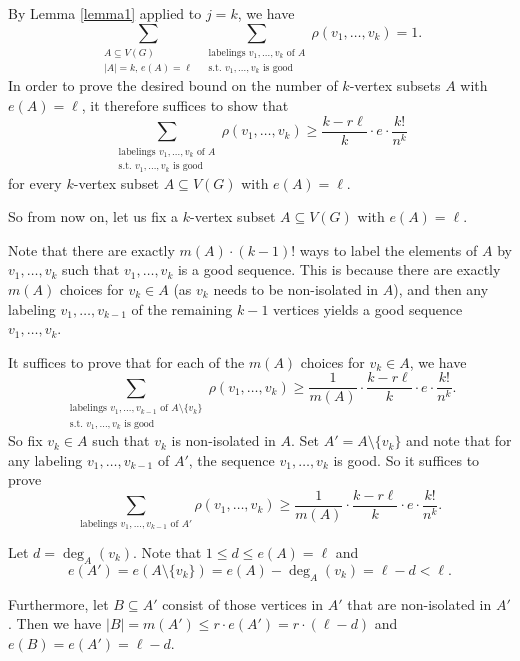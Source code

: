 By Lemma \ref{lemma1} applied to $j=k$, we have
\[\sum_{\substack{A\subseteq V(G)\\\vert A\vert=k,\, e(A)=\ell}}\ \sum_{\substack{\text{labelings }v_1,\dots, v_k\text{ of } A\\\text{s.t.\ }v_1,\dots, v_k\text{ is good}}}\rho(v_1,\dots,v_k)= 1.\]
In order to prove the desired bound on the number of $k$-vertex subsets $A$ with $e(A)=\ell$, it therefore suffices to show that
\[\sum_{\substack{\text{labelings }v_1,\dots, v_k\text{ of } A\\\text{s.t.\ }v_1,\dots, v_k\text{ is good}}}\rho(v_1,\dots,v_k)\geq \frac{k-r\ell}{k}\cdot e\cdot \frac{k!}{n^k}\]
for every $k$-vertex subset $A\subseteq V(G)$ with $e(A)=\ell$.

So from now on, let us fix a $k$-vertex subset $A\subseteq V(G)$ with $e(A)=\ell$. 

Note that there are exactly $m(A)\cdot (k-1)!$ ways to label the elements of $A$ by $v_1,\dots,v_k$ such that $v_1,\dots,v_k$ is a good sequence. This is because there are exactly $m(A)$ choices for $v_k\in A$ (as $v_k$ needs to be non-isolated in $A$), and then any labeling $v_1,\dots,v_{k-1}$ of the remaining $k-1$ vertices yields a good sequence $v_1,\dots,v_k$.

It suffices to prove that for each of the $m(A)$ choices for $v_k\in A$, we have
\[\sum_{\substack{\text{labelings }v_1,\dots, v_{k-1}\text{ of } A\setminus \lbrace v_k\rbrace\\\text{s.t.\ }v_1,\dots, v_k\text{ is good}}}\rho(v_1,\dots,v_k)\geq \frac{1}{m(A)} \cdot \frac{k-r\ell}{k}\cdot e\cdot \frac{k!}{n^k}.\]
So fix $v_k\in A$ such that $v_k$ is non-isolated in $A$. Set $A'=A\setminus \lbrace v_k\rbrace$ and note that for any labeling $v_1,\dots, v_{k-1}$ of $A'$, the sequence $v_1,\dots, v_{k}$ is good. So it suffices to prove
\begin{equation}\label{inequality}
\sum_{\text{labelings }v_1,\dots, v_{k-1}\text{ of } A'}\rho(v_1,\dots,v_k)\geq \frac{1}{m(A)} \cdot \frac{k-r\ell}{k}\cdot e\cdot \frac{k!}{n^k}.
\end{equation}

Let $d=\deg_A(v_k)$. Note that $1\leq d\leq e(A)=\ell$ and
\[e(A')=e(A\setminus \lbrace v_k\rbrace)=e(A)-\deg_A(v_k)=\ell-d<\ell.\]

Furthermore, let $B\subseteq A'$ consist of those vertices in $A'$ that are non-isolated in $A'$. Then we have $\vert B\vert=m(A')\leq r\cdot e(A')=r\cdot (\ell-d)$ and $e(B)=e(A')=\ell-d$.

